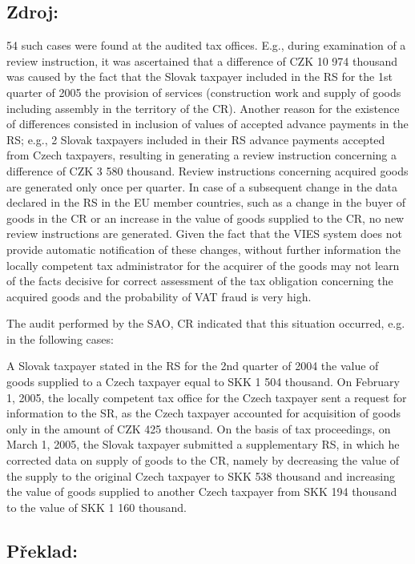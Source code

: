 \documentclass[10pt]{article}
\begin{document}
\subsection*{Zdroj:}

54 such cases were found at the audited tax offices.
E.g., during examination of a review instruction, it was ascertained that a difference of CZK 10 974 thousand was caused by the fact that the Slovak taxpayer included in the RS for the 1st quarter of 2005 the provision of services (construction work and supply of goods including assembly in the territory of the CR).
Another reason for the existence of differences consisted in inclusion of values of accepted advance payments in the RS; e.g., 2 Slovak taxpayers included in their RS advance payments accepted from Czech taxpayers, resulting in generating a review instruction concerning a difference of CZK 3 580 thousand.
Review instructions concerning acquired goods are generated only once per quarter.
In case of a subsequent change in the data declared in the RS in the EU member countries, such as a change in the buyer of goods in the CR or an increase in the value of goods supplied to the CR, no new review instructions are generated.
Given the fact that the VIES system does not provide automatic notification of these changes, without further information the locally competent tax administrator for the acquirer of the goods may not learn of the facts decisive for correct assessment of the tax obligation concerning the acquired goods and the probability of VAT fraud is very high.


The audit performed by the SAO, CR indicated that this situation occurred, e.g. in the following cases:

A Slovak taxpayer stated in the RS for the 2nd quarter of 2004 the value of goods supplied to a Czech taxpayer equal to SKK 1 504 thousand.
On February 1, 2005, the locally competent tax office for the Czech taxpayer sent a request for information to the SR, as the Czech taxpayer accounted for acquisition of goods only in the amount of CZK 425 thousand.
On the basis of tax proceedings, on March 1, 2005, the Slovak taxpayer submitted a supplementary RS, in which he corrected data on supply of goods to the CR, namely by decreasing the value of the supply to the original Czech taxpayer to SKK 538 thousand and increasing the value of goods supplied to another Czech taxpayer from SKK 194 thousand to the value of SKK 1 160 thousand.


\pagebreak

\subsection*{Překlad:}
\end{document}
